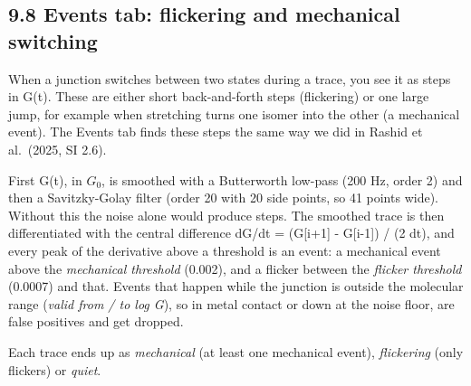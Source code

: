 \documentclass[
  11pt,
  a4paper,
]{article}
\begin{document}
\hypertarget{events-tab-flickering-and-mechanical-switching}{%
\subsection{9.8 Events tab: flickering and mechanical
switching}\label{events-tab-flickering-and-mechanical-switching}}

When a junction switches between two states during a trace, you see it
as steps in G(t). These are either short back-and-forth steps
(flickering) or one large jump, for example when stretching turns one
isomer into the other (a mechanical event). The Events tab finds these
steps the same way we did in Rashid et al.~(2025, SI 2.6).

First G(t), in $G_0$, is smoothed with a Butterworth low-pass (200 Hz,
order 2) and then a Savitzky-Golay filter (order 20 with 20 side points,
so 41 points wide). Without this the noise alone would produce steps.
The smoothed trace is then differentiated with the central difference
dG/dt = (G{[}i+1{]} - G{[}i-1{]}) / (2 dt), and every peak of the
derivative above a threshold is an event: a mechanical event above the
\emph{mechanical threshold} (0.002), and a flicker between the
\emph{flicker threshold} (0.0007) and that. Events that happen while the
junction is outside the molecular range (\emph{valid from / to log G}),
so in metal contact or down at the noise floor, are false positives and
get dropped.

Each trace ends up as \emph{mechanical} (at least one mechanical event),
\emph{flickering} (only flickers) or \emph{quiet}.
\end{document}
